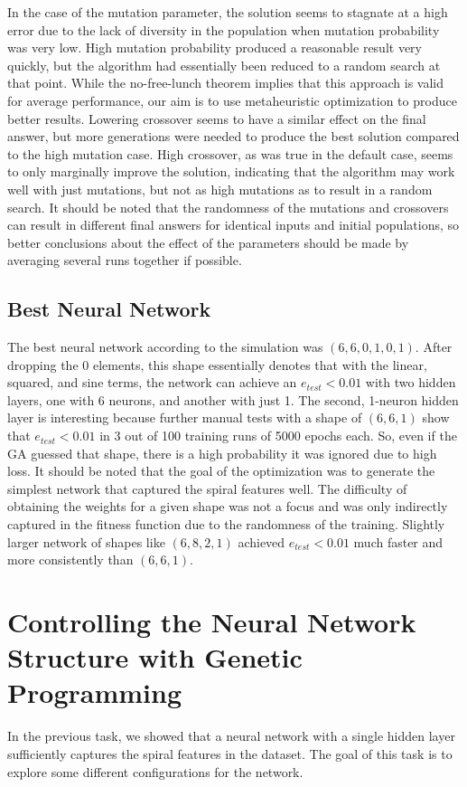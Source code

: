 \documentclass[12pt]{article}
\begin{document}
In the case of the mutation parameter, the solution seems to stagnate at a high error due to the lack of diversity in the population when mutation probability was very low. High mutation probability produced a reasonable result very quickly, but the algorithm had essentially been reduced to a random search at that point. While the no-free-lunch theorem implies that this approach is valid for average performance, our aim is to use metaheuristic optimization to produce better results. Lowering crossover seems to have a similar effect on the final answer, but more generations were needed to produce the best solution compared to the high mutation case. High crossover, as was true in the default case, seems to only marginally improve the solution, indicating that the algorithm may work well with just mutations, but not as high mutations as to result in a random search. It should be noted that the randomness of the mutations and crossovers can result in different final answers for identical inputs and initial populations, so better conclusions about the effect of the parameters should be made by averaging several runs together if possible. 

\subsection{Best Neural Network}
The best neural network according to the simulation was $(6,6,0,1,0,1)$. After dropping the 0 elements, this shape essentially denotes that with the linear, squared, and sine terms, the network can achieve an $e_{test}<0.01$ with two hidden layers, one with 6 neurons, and another with just 1. 
The second, 1-neuron hidden layer is interesting because further manual tests with a shape of $(6,6,1)$ show that $e_{test}<0.01$ in 3 out of 100 training runs of 5000 epochs each. So, even if the GA guessed that shape, there is a high probability it was ignored due to high loss. It should be noted that the goal of the optimization was to generate the simplest network that captured the spiral features well. The difficulty of obtaining the weights for a given shape was not a focus and was only indirectly captured in the fitness function due to the randomness of the training. Slightly larger network of shapes like $(6,8,2,1)$ achieved $e_{test}<0.01$ much faster and more consistently than $(6,6,1)$. 

\section{Controlling the Neural Network Structure with Genetic Programming}
In the previous task, we showed that a neural network with a single hidden layer sufficiently captures the spiral features in the dataset. The goal of this task is to explore some different configurations for the network.
\end{document}
